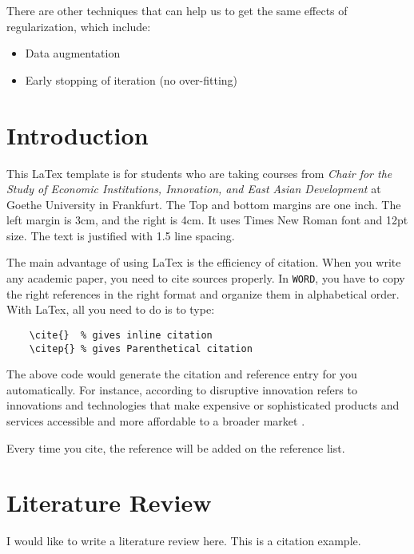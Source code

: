 \documentclass[12pt]{article}
\theoremstyle{definition}
\numberwithin{equation}{section}
\begin{document}
There are other techniques that can help us to get the same effects of regularization, which include:
\begin{itemize}
	\item Data augmentation 
	\item Early stopping of iteration (no over-fitting)
\end{itemize}



\newpage
{}
\setcounter{page}{1}
\section{Introduction}

This LaTex template is for students who are taking courses from \textit{Chair
for the Study of Economic Institutions, Innovation, and East Asian Development}
at Goethe University in Frankfurt. The Top and bottom margins are one inch. The left
margin is 3cm, and the right is 4cm. It uses Times New Roman font and 12pt size.
The text is justified with 1.5 line spacing. 

The main advantage of using LaTex is the efficiency of citation. When you write
any academic paper, you need to cite sources properly. In \texttt{WORD}, you have
to copy the right references in the right format and organize them in alphabetical
order. With LaTex, all you need to do is to type:
\begin{lstlisting}
    \cite{}  % gives inline citation
    \citep{} % gives Parenthetical citation
\end{lstlisting}

The above code would generate the citation and reference entry for you automatically.
For instance, according to \cite{christensen2013disruptive} disruptive innovation
refers to innovations and technologies that make expensive or sophisticated 
products and services accessible and more affordable to a broader market \citep{greenwade93}.

Every time you cite, the reference will be added on the reference list.



\section{Literature Review}

I would like to write a literature review here. This is a citation example.
\end{document}
